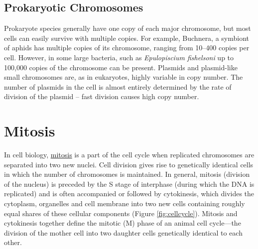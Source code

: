 \hypertarget{prokaryotic-chromosomes}{%
\subsection{Prokaryotic Chromosomes}\label{prokaryotic-chromosomes}}

Prokaryote species generally have one copy of each major chromosome, but most cells can easily survive with multiple copies. For example, Buchnera, a symbiont of aphids has multiple copies of its chromosome, ranging from 10--400 copies per cell. However, in some large bacteria, such as \emph{Epulopiscium fishelsoni} up to 100,000 copies of the chromosome can be present. Plasmids and plasmid-like small chromosomes are, as in eukaryotes, highly variable in copy number. The number of plasmids in the cell is almost entirely determined by the rate of division of the plasmid -- fast division causes high copy number.

\hypertarget{mitosis}{%
\section{Mitosis}\label{mitosis}}

In cell biology, \href{https://en.wikipedia.org/wiki/Mitosis}{mitosis} is a part of the cell cycle when replicated chromosomes are separated into two new nuclei. Cell division gives rise to genetically identical cells in which the number of chromosomes is maintained. In general, mitosis (division of the nucleus) is preceded by the S stage of interphase (during which the DNA is replicated) and is often accompanied or followed by cytokinesis, which divides the cytoplasm, organelles and cell membrane into two new cells containing roughly equal shares of these cellular components (Figure \ref{fig:cellcycle}). Mitosis and cytokinesis together define the mitotic (M) phase of an animal cell cycle---the division of the mother cell into two daughter cells genetically identical to each other.



